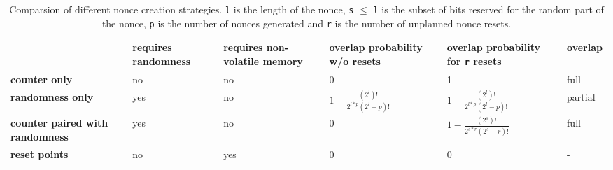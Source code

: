 \begin{table}[htb]
	\footnotesize
	\caption{Comparsion of different nonce creation strategies. \texttt{l} is the length of the
		nonce, \texttt{s} $\leq$ \texttt{l} is the subset of bits reserved for the random part of the nonce,
		\texttt{p} is the number of nonces generated and \texttt{r} is the number of unplanned nonce
		resets.}
	\label{tab:nonce}
	\renewcommand\arraystretch{2}
	\begin{tabularx}{1.1\linewidth}{|X|X|X|X|X|X|}
		\hline
		                                        & \textbf{requires randomness}                       & \textbf{requires non-volatile memory} & \textbf{overlap probability w/o
		resets}                                 & \textbf{overlap probability for \texttt{r} resets} & \textbf{overlap}                                                                                                    \\
		\hline
		\textbf{counter only}                   & no                                                 & no                                    & 0                               & 1                                  & full \\
		\hline
		\textbf{randomness only}                & yes                                                & no                                    &
		$1-\frac{(2^l)!}{2^{l*p}(2^l-p)!}$
		                                        & $1-\frac{(2^l)!}{2^{l*p}(2^l-p)!}$                 & partial                                                                                                             \\
		\hline
		\textbf{counter paired with randomness} & yes                                                & no                                    & 0                               & $1-\frac{(2^s)!}{2^{s*r}(2^s-r)!}$
		                                        & full                                                                                                                                                                     \\
		\hline
		\textbf{reset points}                   & no                                                 & yes                                   & 0                               & 0                                  & -    \\
		\hline
	\end{tabularx}%
\end{table}


